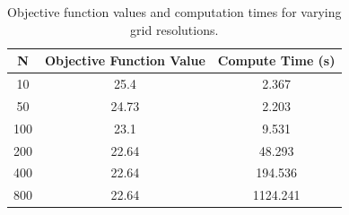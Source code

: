 \begin{table}
    \centering
    \begin{tabular}{ccc}
        \hline
        N & Objective Function Value & Compute Time (s) \\
        \hline
        10 & 25.4 & 2.367\\
        50 & 24.73 & 2.203\\
        100 & 23.1 & 9.531\\
        200 & 22.64 & 48.293\\
        400 & 22.64 & 194.536\\
        800 & 22.64 & 1124.241\\
        \hline
    \end{tabular}
    \caption{Objective function values and computation times for varying grid resolutions.}
    \label{tab:grid_resolution}
\end{table}
